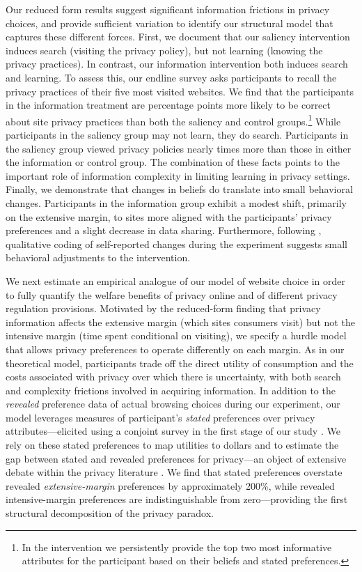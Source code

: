 \documentclass[12pt]{article}
\theoremstyle{definition}
\theoremstyle{remark}
\begin{document}
Our reduced form results suggest significant information frictions in privacy choices, and provide sufficient variation to identify our structural model that captures these different forces. First, we document that our saliency intervention induces search (visiting the privacy policy), but not learning (knowing the privacy practices). In contrast, our information intervention both induces search and learning. To assess this, our endline survey asks participants to recall the privacy practices of their five most visited websites. We find that the participants in the information treatment are \beliefCorrectInfoVsRestPP{} percentage points more likely to be correct about site privacy practices than both the saliency and control groups.\footnote{In the intervention we persistently provide the top two most informative attributes for the participant based on their beliefs and stated preferences.} 
While participants in the saliency group may not learn, they do search. Participants in the saliency group viewed privacy policies nearly \policyVisitSaliencyFold{} times more than those in either the information or control group. The combination of these facts points to the important role of information complexity in limiting learning in privacy settings. Finally, we demonstrate that changes in beliefs do translate into small behavioral changes. Participants in the information group exhibit a modest shift, primarily on the extensive margin, to sites more aligned with the participants' privacy preferences and a slight decrease in data sharing. Furthermore, following \cite{haaland2025understanding}, qualitative coding of self-reported changes during the experiment suggests small behavioral adjustments to the intervention.

We next estimate an empirical analogue of our model of website choice in order to fully quantify the welfare benefits of privacy online and of different privacy regulation provisions. Motivated by the reduced-form finding that privacy information affects the extensive margin (which sites consumers visit) but not the intensive margin (time spent conditional on visiting), we specify a hurdle model that allows privacy preferences to operate differently on each margin. As in our theoretical model, participants trade off the direct utility of consumption and the costs associated with privacy over which there is uncertainty, with both search and complexity frictions involved in acquiring information. In addition to the \textit{revealed} preference data of actual browsing choices during our experiment, our model leverages measures of participant's \textit{stated} preferences over privacy attributes---elicited using a conjoint survey in the first stage of our study \citep{ALLENBY2019151}. We rely on these stated preferences to map utilities to dollars and to estimate the gap between stated and revealed preferences for privacy---an object of extensive debate within the privacy literature \citep{norberg2007privacy, f4d6c48d-b77c-3568-b51c-5946aee2b9de, athey2025digital}. We find that stated preferences overstate revealed \emph{extensive-margin} preferences by approximately 200\%, while revealed intensive-margin preferences are indistinguishable from zero---providing the first structural decomposition of the privacy paradox. %
\end{document}
